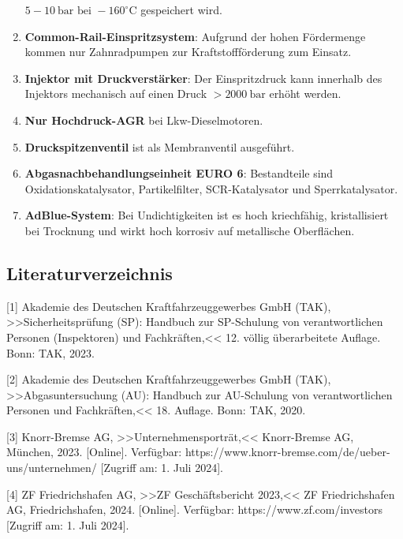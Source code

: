 \documentclass{vorlage-design-main}
\begin{document}
\begin{enumerate}
  $\boxed{5 - 10~\text{bar bei } -160^\circ\text{C}}$ gespeichert
  wird.
\item
  \textbf{Common-Rail-Einspritzsystem}: Aufgrund der hohen Fördermenge
  kommen nur Zahnradpumpen zur Kraftstoffförderung zum Einsatz.
\item
  \textbf{Injektor mit Druckverstärker}: Der Einspritzdruck kann
  innerhalb des Injektors mechanisch auf einen Druck
  $\boxed{> 2000~\text{bar}}$ erhöht werden.
\item
  \textbf{Nur Hochdruck-AGR} bei Lkw-Dieselmotoren.
\item
  \textbf{Druckspitzenventil} ist als Membranventil ausgeführt.
\item
  \textbf{Abgasnachbehandlungseinheit EURO 6}: Bestandteile sind
  Oxidationskatalysator, Partikelfilter, SCR-Katalysator und
  Sperrkatalysator.
\item
  \textbf{AdBlue-System}: Bei Undichtigkeiten ist es hoch kriechfähig,
  kristallisiert bei Trocknung und wirkt hoch korrosiv auf metallische
  Oberflächen.
\end{enumerate}

\subsection{Literaturverzeichnis}\label{literaturverzeichnis}

{[}1{]} Akademie des Deutschen Kraftfahrzeuggewerbes GmbH (TAK),
>>Sicherheitsprüfung (SP): Handbuch zur SP-Schulung von verantwortlichen
Personen (Inspektoren) und Fachkräften,<< 12. völlig überarbeitete
Auflage. Bonn: TAK, 2023.

{[}2{]} Akademie des Deutschen Kraftfahrzeuggewerbes GmbH (TAK),
>>Abgasuntersuchung (AU): Handbuch zur AU-Schulung von verantwortlichen
Personen und Fachkräften,<< 18. Auflage. Bonn: TAK, 2020.

{[}3{]} Knorr-Bremse AG, >>Unternehmensporträt,<< Knorr-Bremse AG,
München, 2023. {[}Online{]}. Verfügbar:
https://www.knorr-bremse.com/de/ueber-uns/unternehmen/ {[}Zugriff am: 1.
Juli 2024{]}.

{[}4{]} ZF Friedrichshafen AG, >>ZF Geschäftsbericht 2023,<< ZF
Friedrichshafen AG, Friedrichshafen, 2024. {[}Online{]}. Verfügbar:
https://www.zf.com/investors {[}Zugriff am: 1. Juli 2024{]}.


\clearpage
\printbibliography
\end{document}
